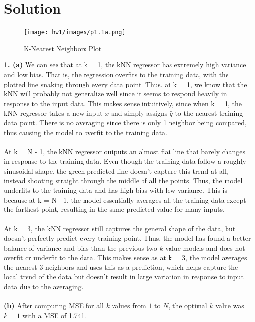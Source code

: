 \documentclass[submit]{../harvardml}
\newenvironment{solution}
  {\color{black}\section*{Solution}}
{}
\begin{document}
\newpage
\begin{solution}
    \begin{figure}
        \centering
        \texttt{[image: hw1/images/p1.1a.png]}
        \caption{K-Nearest Neighbors Plot}
    \end{figure}
    \begin{tcolorbox}
        \textbf{1. (a)} We can see that at k = 1, the kNN regressor has extremely high variance and low bias. That is, the regression overfits to the training data, with the plotted line snaking through every data point. Thus, at k = 1, we know that the kNN will probably not generalize well since it seems to respond heavily in response to the input data. This makes sense intuitively, since when k = 1, the kNN regressor takes a new input $x$ and simply assigns $\hat{y}$ to the nearest training data point. There is no averaging since there is only 1 neighbor being compared, thus causing the model to overfit to the training data.
        \\
        \\
        At k = N - 1, the kNN regressor outputs an almost flat line that barely changes in response to the training data. Even though the training data follow a roughly sinusoidal shape, the green predicted line doesn't capture this trend at all, instead shooting straight through the middle of all the points. Thus, the model underfits to the training data and has high bias with low variance. This is because at k = N - 1, the model essentially averages all the training data except the farthest point, resulting in the same predicted value for many inputs.
        \\
        \\
        At k = 3, the kNN regressor still captures the general shape of the data, but doesn't perfectly predict every training point. Thus, the model has found a better balance of variance and bias than the previous two $k$ value models and does not overfit or underfit to the data. This makes sense as at k = 3, the model averages the nearest 3 neighbors and uses this as a prediction, which helps capture the local trend of the data but doesn't result in large variation in response to input data due to the averaging.
        \\
        \\
        \textbf{(b)} After computing MSE for all $k$ values from $1$ to $N$, the optimal $k$ value was $k = 1$ with a MSE of 1.741.
    \end{tcolorbox}
    \begin{figure}

\end{figure}
\end{solution}
\end{document}

